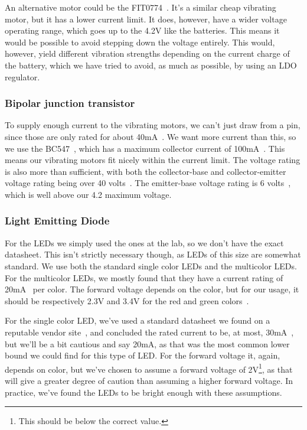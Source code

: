 \documentclass[acmsmall]{acmart}
\begin{document}
An alternative motor could be the FIT0774~\cite{motoralternative}. It's a similar cheap vibrating motor, but it has a lower current limit. It does, however, have a 
wider voltage operating range, which goes up to the 4.2V like the batteries. This means it would be possible to avoid stepping down the voltage entirely. This would, however,
yield different vibration strengths depending on the current charge of the battery, which we have tried to avoid, as much as possible, by using an LDO regulator.

\subsubsection{Bipolar junction transistor}\label{sec_component_bjt}
To supply enough current to the vibrating motors, we can't just draw from a pin, since those are only rated for about 40mA~\cite[][p.258]{atmega328p}. 
We want more current than this, so we use the BC547~\cite{transistor}, which has a maximum collector current of 100mA~\cite[][p.1]{transistor}. 
This means our vibrating motors fit nicely within the current limit. 
The voltage rating is also more than sufficient, with both the collector-base and collector-emitter voltage rating being over 40 volts~\cite[][p.1]{transistor}. 
The emitter-base voltage rating is 6 volts~\cite[][p.1]{transistor}, which is well above our 4.2 maximum voltage.

\subsubsection{Light Emitting Diode}\label{sec_component_led}
For the LEDs we simply used the ones at the lab, so we don't have the exact datasheet. This isn't strictly necessary though, as LEDs of this size are somewhat standard.
We use both the standard single color LEDs and the multicolor LEDs. For the multicolor LEDs, we mostly found that they have a current rating of 20mA~\cite[][p.1]{multicolorled} 
per color. The forward voltage depends on the color, but for our usage, it should be respectively 2.3V and 3.4V for the red and green colors~\cite[][p.1]{multicolorled}. 

For the single color LED, we've used a standard datasheet we found on a reputable vendor site~\cite{led}, and concluded the rated current to be, at most, 30mA~\cite[][p.2]{led}, 
but we'll be a bit cautious and say 20mA, as that was the most common lower bound we could find for this type of LED. For the forward voltage it, again, depends on color, 
but we've chosen to assume a forward voltage of 2V\footnote{This should be below the correct value. }, as that will give a greater degree of caution than assuming a higher forward voltage. 
In practice, we've found the LEDs to be bright enough with these assumptions.
\end{document}
